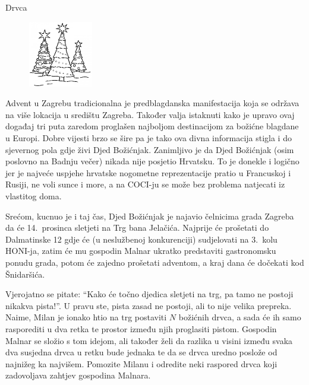 \begin{statement}[
  problempoints=110,
  timelimit=1 sekunda,
  memorylimit=512 MiB,
]{Drvca}

\setlength\intextsep{-0.1cm}
\begin{figure}
\centering
\includegraphics[width=0.25\textwidth]{img/drvca.png}
\end{figure}

Advent u Zagrebu tradicionalna je predblagdanska manifestacija koja se održava
na više lokacija u središtu Zagreba. Također valja istaknuti kako je upravo
ovaj događaj tri puta zaredom proglašen najboljom destinacijom za božićne
blagdane u Europi. Dobre vijesti brzo se šire pa je tako ova divna informacija
stigla i do sjevernog pola gdje živi Djed Božićnjak. Zanimljivo je da Djed
Božićnjak (osim poslovno na Badnju večer) nikada nije posjetio Hrvatsku. To je
donekle i logično jer je najveće uspjehe hrvatske nogometne reprezentacije
pratio u Francuskoj i Rusiji, ne voli sunce i more, a na COCI-ju se može bez
problema natjecati iz vlastitog doma.

Srećom, kucnuo je i taj čas, Djed Božićnjak je najavio čelnicima grada Zagreba
da će 14.\ prosinca sletjeti na Trg bana Jelačića. Najprije će prošetati do
Dalmatinske 12 gdje će (u neslužbenoj konkurenciji) sudjelovati na 3.\ kolu
HONI-ja, zatim će mu gospodin Malnar ukratko predstaviti gastronomsku ponudu
grada, potom će zajedno prošetati adventom, a kraj dana će dočekati kod
Šnidaršića.

Vjerojatno se pitate: ``Kako će točno djedica sletjeti na trg, pa tamo ne
postoji nikakva pista!''. U pravu ste, pista zasad ne postoji, ali to nije
velika prepreka. Naime, Milan je ionako htio na trg postaviti $N$ božićnih
drvca, a sada će ih samo rasporediti u dva retka te prostor između njih
proglasiti pistom. Gospodin Malnar se složio s tom idejom, ali također želi da
razlika u visini između svaka dva susjedna drvca u retku bude jednaka te da se
drvca uredno poslože od najnižeg ka najvišem. Pomozite Milanu i odredite neki
raspored drvca koji zadovoljava zahtjev gospodina Malnara.


\end{statement}
